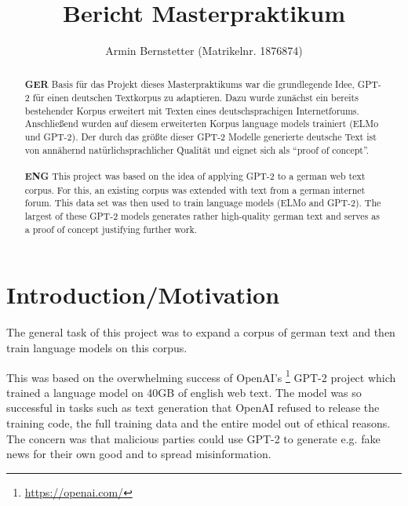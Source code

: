 \documentclass{scrartcl}
\begin{document}

\title{Bericht Masterpraktikum}

\author{Armin Bernstetter (Matrikelnr. 1876874)}

\maketitle

\begin{abstract}
\textbf{GER}
Basis für das Projekt dieses Masterpraktikums war die grundlegende Idee, GPT-2 für einen deutschen Textkorpus zu adaptieren. Dazu wurde zunächst ein bereits bestehender Korpus erweitert mit Texten eines deutschsprachigen Internetforums. Anschließend wurden auf diesem erweiterten Korpus language models trainiert (ELMo und GPT-2). Der durch das größte dieser GPT-2 Modelle generierte deutsche Text ist von annähernd natürlichsprachlicher Qualität und eignet sich als \enquote{proof of concept}.
\\\\
\textbf{ENG}
This project was based on the idea of applying GPT-2 to a german web text corpus. For this, an existing corpus was extended with text from a german internet forum. This data set was then used to train language models (ELMo and GPT-2). The largest of these GPT-2 models generates rather high-quality german text and serves as a proof of concept justifying further work.
\end{abstract}





\section{Introduction/Motivation}

The general task of this project was to expand a corpus of german text and then train language models on this corpus.

This was based on the overwhelming success of OpenAI's \footnote{\url{https://openai.com/}} GPT-2 project \cite{radford2019language} which trained a language model on 40GB of english web text. The model was so successful in tasks such as text generation that OpenAI refused to release the training code, the full training data and the entire model out of ethical reasons. The concern was that malicious parties could use GPT-2 to generate e.g. fake news for their own good and to spread misinformation.
\end{document}
